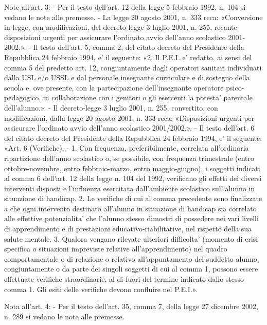     Note all'art. 3:
    - Per il testo dell'art. 12 della legge 5 febbraio 1992, n. 104 si vedano le note alle premesse.
    - La legge 20 agosto 2001, n. 333 reca: «Conversione in legge, con modificazioni, del decreto-legge 3 luglio 2001, n. 255, recante disposizioni urgenti per assicurare l'ordinato avvio dell'anno scolastico 2001-2002.».
    - Il testo dell'art. 5, comma 2, del citato decreto del Presidente della Repubblica 24 febbraio 1994, e' il seguente: «2. Il P.E.I. e' redatto, ai sensi del comma 5 del predetto art. 12, congiuntamente dagli operatori sanitari individuati dalla USL e/o USSL e dal personale insegnante curriculare e di sostegno della scuola e, ove presente, con la partecipazione dell'insegnante operatore psico-pedagogico, in collaborazione con i genitori o gli esercenti la potesta' parentale dell'alunno.».
    - Il decreto-legge 3 luglio 2001, n. 255, convertito, con modificazioni, dalla legge 20 agosto 2001, n. 333 reca: «Disposizioni urgenti per assicurare l'ordinato avvio dell'anno scolastico 2001/2002.».
    - Il testo dell'art. 6 del citato decreto del Presidente della Repubblica 24 febbraio 1994, e' il seguente: «Art. 6 (Verifiche). - 1. Con frequenza, preferibilmente, correlata all'ordinaria ripartizione dell'anno scolastico o, se possibile, con frequenza trimestrale (entro ottobre-novembre, entro febbraio-marzo, entro maggio-giugno), i soggetti indicati al comma 6 dell'art. 12 della legge n. 104 del 1992, verificano gli effetti dei diversi interventi disposti e l'influenza esercitata dall'ambiente scolastico sull'alunno in
    situazione di handicap. 2. Le verifiche di cui al comma precedente sono finalizzate a che ogni intervento destinato all'alunno in
    situazione di handicap sia correlato alle effettive potenzialita' che l'alunno stesso dimostri di possedere nei vari livelli di apprendimento e di prestazioni educativo-riabilitative, nel rispetto della sua salute mentale. 3. Qualora vengano rilevate ulteriori difficolta' (momento di crisi specifica o situazioni impreviste relative all'apprendimento) nel quadro comportamentale o di relazione o relativo all'appuntamento del suddetto alunno, congiuntamente o da parte dei singoli soggetti di cui al comma 1, possono essere effettuate verifiche straordinarie, al di fuori del termine indicato dallo stesso comma 1. Gli esiti delle verifiche devono confluire nel P.E.I.».

    Nota all'art. 4:
    - Per il testo dell'art. 35, comma 7, della legge 27 dicembre 2002, n. 289 si vedano le note alle premesse.
